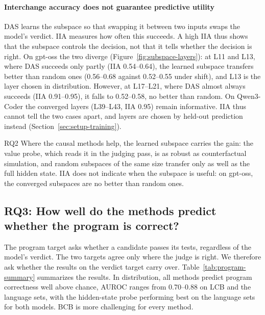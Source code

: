 \paragraph{Interchange accuracy does not guarantee predictive utility}
DAS learns the subspace so that swapping it between two inputs swaps the
model's verdict. IIA measures how often this succeeds. A high IIA thus shows
that the subspace controls the decision, not that it tells whether the decision
is right. On gpt-oss the two diverge (Figure~\ref{fig:subspace-layers}): at L11
and L13, where DAS succeeds only partly (IIA 0.54--0.64), the learned subspace
transfers better than random ones (0.56--0.68 against 0.52--0.55 under shift),
and L13 is the layer chosen in distribution. However, at L17--L21, where DAS almost
always succeeds (IIA 0.91--0.95), it falls to 0.52--0.58, no better than
random. %
On Qwen3-Coder the converged layers (L39--L43, IIA 0.95) remain informative. IIA thus cannot tell the two cases apart, and layers are chosen by held-out prediction instead (Section~\ref{sec:setup-training}).

\begin{rqanswer}{RQ2}
Where the causal methods help, the learned subspace carries the gain: the value
probe, which reads it in the judging pass, is as robust as counterfactual
simulation, and random subspaces of the same size transfer only as well as the
full hidden state. %
IIA does not indicate when the subspace is useful: on gpt-oss, the
converged subspaces are no better than random ones.
\end{rqanswer}
 

\subsection{RQ3: How well do the methods predict whether the program is correct?}
\label{sec:rq-program}


The program target asks whether a candidate passes its tests, regardless of
the model's verdict. The two targets
agree only where the judge is right. %
We therefore ask whether the results on the verdict target carry over. Table~\ref{tab:program-summary} summarizes the results. In distribution, all methods predict
program correctness well above chance, AUROC ranges from 0.70--0.88 on LCB and the language
sets, with the hidden-state probe performing best on the language sets for both models. BCB is more challenging for every method.

